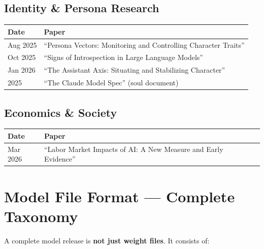 \documentclass[11pt,a4paper]{article}
\begin{document}
\subsection{Identity \& Persona Research}

\begin{center}
\begin{tabular}{lL{8cm}}
\toprule
\textbf{Date} & \textbf{Paper} \\
\midrule
Aug 2025 & ``Persona Vectors: Monitoring and Controlling Character Traits'' \\
Oct 2025 & ``Signs of Introspection in Large Language Models'' \\
Jan 2026 & ``The Assistant Axis: Situating and Stabilizing Character'' \\
2025 & ``The Claude Model Spec'' (soul document) \\
\bottomrule
\end{tabular}
\end{center}

\subsection{Economics \& Society}

\begin{center}
\begin{tabular}{lL{8cm}}
\toprule
\textbf{Date} & \textbf{Paper} \\
\midrule
Mar 2026 & ``Labor Market Impacts of AI: A New Measure and Early Evidence'' \\
\bottomrule
\end{tabular}
\end{center}

\section{Model File Format --- Complete Taxonomy}

A complete model release is \textbf{not just weight files}. It consists of:
\end{document}
